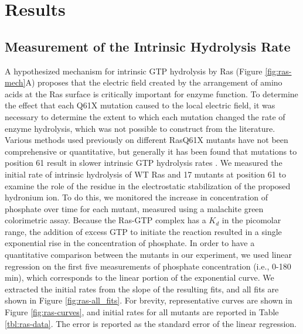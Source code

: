 \section{Results} \label{ras-results}

\subsection{Measurement of the Intrinsic Hydrolysis Rate}

A hypothesized mechanism for intrinsic GTP hydrolysis by Ras (Figure \ref{fig:ras-mech}A) proposes that the electric field created by the arrangement of amino acids at the Ras surface is critically important for enzyme function. 
To determine the effect that each Q61X mutation caused to the local electric field, it was necessary to determine the extent to which each mutation changed the rate of enzyme hydrolysis, which was not possible to construct from the literature. 
Various methods used previously on different RasQ61X mutants have not been comprehensive or quantitative, but generally it has been found that mutations to position 61 result in slower intrinsic GTP hydrolysis rates \cite{Der1986, Krengel1990}. 
We measured the initial rate of intrinsic hydrolysis of WT Ras and 17 mutants at position 61 to examine the role of the residue in the electrostatic stabilization of the proposed hydronium ion. 
To do this, we monitored the increase in concentration of phosphate over time for each mutant, measured using a malachite green colorimetric assay. 
Because the Ras-GTP complex has a $K_d$ in the picomolar range, the addition of excess GTP to initiate the reaction resulted in a single exponential rise in the concentration of phosphate. 
In order to have a quantitative comparison between the mutants in our experiment, we used linear regression on the first five measurements of phosphate concentration (i.e., 0-180 min), which corresponds to the linear portion of the exponential curve. 
We extracted the initial rates from the slope of the resulting fits, and all fits are shown in Figure \ref{fig:ras-all_fits}. 
For brevity, representative curves are shown in Figure \ref{fig:ras-curves}, and initial rates for all mutants are reported in Table \ref{tbl:ras-data}. 
The error is reported as the standard error of the linear regression. 
